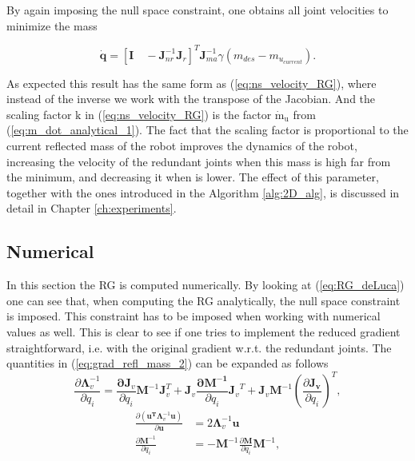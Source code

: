 By again imposing the null space constraint, one obtains all joint velocities to minimize the mass

\begin{equation}
\mathbf{\dot{q}} = [\mathbf{I} \quad  -\mathbf{J}_{nr}^{-1} \mathbf{J}_r]^T   \mathbf{J}_{ma}^{-1} \gamma (m_{des} - m_{u_{current}})  .
\label{eq:qdot_analytical}
\end{equation}

As expected this result has the same form as (\ref{eq:ns_velocity_RG}), where instead of the inverse we work with the transpose of the Jacobian. And the scaling factor $\mathrm{k}$ in (\ref{eq:ns_velocity_RG}) is the factor $\mathrm{\dot{m}_u}$ from (\ref{eq:m_dot_analytical_1}). The fact that the scaling factor is proportional to the current reflected mass of the robot improves the dynamics of the robot, increasing the velocity of the redundant joints when this mass is high far from the minimum, and decreasing it when is lower. 
The effect of this parameter, together with the ones introduced in the Algorithm \ref{alg:2D_alg}, is discussed in detail in Chapter \ref{ch:experiments}.



\subsection{Numerical}
\label{sec:numerical}


In this section the RG is computed numerically. By looking at (\ref{eq:RG_deLuca}) one can see that, when computing the RG  analytically, the null space constraint is imposed. This constraint has to be  imposed when working with numerical values as well. This is clear to see if one  tries to  implement the reduced gradient straightforward, i.e. with the original gradient w.r.t. the redundant joints.  The quantities in (\ref{eq:grad_refl_mass_2}) can be expanded as follows
\begin{equation}
\frac{\partial {\mathbf{\Lambda}_{v}^{-1}}}{\partial {q_i}} = \frac{\mathbf{\partial {J}}_v}{\partial {q_i}}\mathbf{M}^{-1} \mathbf{J}_v^T + \mathbf{J}_v \frac{\mathbf{\partial {M^{-1}}}}{\partial {q_i}} {\mathbf{J}_v}^T + \mathbf{J}_v \mathbf{M}^{-1} \left ( \frac{\partial \mathbf{{J}_v}}{\partial {q_i}} \right )^T  ,
\end{equation}
\begin{align}
\frac{\partial {(\mathbf{u^T} \mathbf{\Lambda}_{v}^{-1} \mathbf{u})}}{\partial {\mathbf{u}}}& = 2 \mathbf{\Lambda}_{v}^{-1} \mathbf{u} \\
\frac{\partial {\mathrm{\mathbf{M}}^{-1}}}{\partial {q_i}} & = -\mathbf{M}^{-1} 
\frac{\partial {\mathrm{\mathbf{M}}}}{\partial {q_i}} \mathrm{\mathbf{M}}^{-1},
\end{align}


